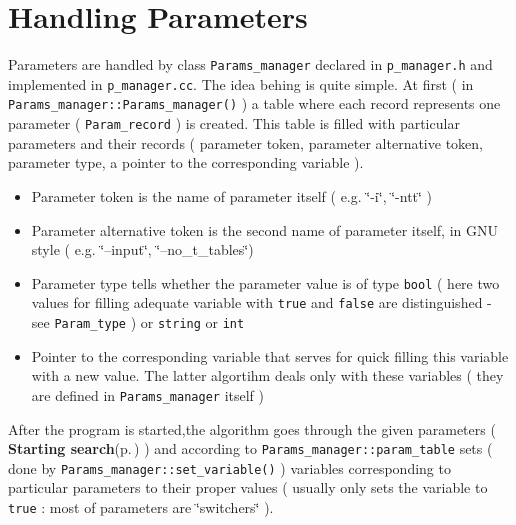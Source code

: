 \section{Handling Parameters}\label{page_1}
Parameters are handled by class {\tt Params\_\-manager} declared in {\tt p\_\-manager.h} and implemented in {\tt p\_\-manager.cc}. The idea behing is quite simple. At first ( in {\tt Params\_\-manager::Params\_\-manager()} ) a table where each record represents one parameter ( {\tt Param\_\-record} ) is created. This table is filled with particular parameters and their records ( parameter token, parameter alternative token, parameter type, a pointer to the corresponding variable ).\begin{itemize}
\item Parameter token is the name of parameter itself ( e.g. \char`\"{}-i\char`\"{}, \char`\"{}-ntt\char`\"{} )\item Parameter alternative token is the second name of parameter itself, in GNU style ( e.g. \char`\"{}--input\char`\"{}, \char`\"{}--no\_\-t\_\-tables\char`\"{})\item Parameter type tells whether the parameter value is of type {\tt bool} ( here two values for filling adequate variable with {\tt true} and {\tt false} are distinguished - see {\tt Param\_\-type} ) or {\tt string} or {\tt int} \item Pointer to the corresponding variable that serves for quick filling this variable with a new value. The latter algortihm deals only with these variables ( they are defined in {\tt Params\_\-manager} itself )\end{itemize}


After the program is started,the algorithm goes through the given parameters ( {\bf Starting search}{\rm (p.\,\pageref{page_2})} ) and according to {\tt Params\_\-manager::param\_\-table} sets ( done by {\tt Params\_\-manager::set\_\-variable()} ) variables corresponding to particular parameters to their proper values ( usually only sets the variable to {\tt true} : most of parameters are \char`\"{}switchers\char`\"{} ). 